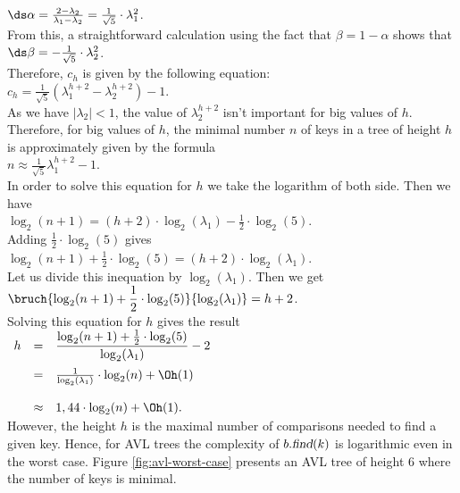 \hspace*{1.3cm}
$\ds \alpha = \frac{2 - \lambda_2}{\lambda_1 - \lambda_2} = \frac{1}{\sqrt{5}} \cdot \lambda_1^2$.
\\[0.2cm]
From this, a straightforward calculation using the fact that $\beta = 1 - \alpha$ shows that 
\\[0.2cm]
\hspace*{1.3cm}
$\ds \beta  = -\frac{1}{\sqrt{5}} \cdot \lambda_2^2$.
\\[0.2cm]
Therefore, $c_h$ is given by the following equation:
\\[0.2cm]
\hspace*{1.3cm}
$c_h = \displaystyle \frac{1}{\sqrt{5}} \left( \lambda_1^{h+2} - \lambda_2^{h+2} \right) -
1$.  
\\[0.2cm]
As we have  $|\lambda_2| < 1$, the value of  $\displaystyle\lambda_2^{h+2}$ isn't important for big
values of $h$.  Therefore, for big values of $h$, the minimal number  $n$ of keys in a tree of
height  $h$ is approximately given by the formula \\[0.2cm]
\hspace*{1.3cm} $n \approx \displaystyle \frac{1}{\sqrt{5}} \lambda_1^{h+2} - 1$. \\[0.2cm]
In order to solve this equation for  $h$ we take the logarithm of both side.  Then we have
\\[0.2cm]
\hspace*{1.3cm}
$\log_2(n+1) = (h+2) \cdot \log_2(\lambda_1) - \frac{1}{2}\cdot \log_2(5)$.
\\[0.2cm]
Adding  $\frac{1}{2}\cdot \log_2(5)$ gives
\\[0.2cm]
\hspace*{1.3cm}
$\log_2(n+1) + \frac{1}{2}\cdot \log_2(5) = (h+2) \cdot \log_2(\lambda_1)$.
\\[0.2cm]
Let us divide this inequation by  $\log_2(\lambda_1)$.  Then we get
\\[0.4cm]
\hspace*{1.3cm}
$\displaystyle \bruch{\log_2(n+1) + \frac{1}{2}\cdot \log_2(5)}{\log_2(\lambda_1)} = h+2$.
\\[0.2cm]
Solving this equation for  $h$ gives the result 
\\[0.4cm]
\hspace*{1.3cm} 
$
\begin{array}[t]{lcl}
h & = & \displaystyle \frac{\log_2(n+1) + \frac{1}{2}\cdot \log_2(5)}{\log_2(\lambda_1)} - 2 \\[0.4cm]
  & = & \frac{1}{\log_2(\lambda_1)}\cdot \log_2(n) + \Oh(1) \\[0.5cm]
  & \approx & 1,44 \cdot \log_2(n) + \Oh(1).
\end{array} 
$
\\[0.2cm]
However, the height $h$ is the maximal number of comparisons needed to find a given key.
Hence, for AVL trees the complexity of $b.\textsl{find}(k)$ is logarithmic even in the worst case.
Figure 
\ref{fig:avl-worst-case} presents an  AVL tree of height 6 where the number of keys is minimal.



